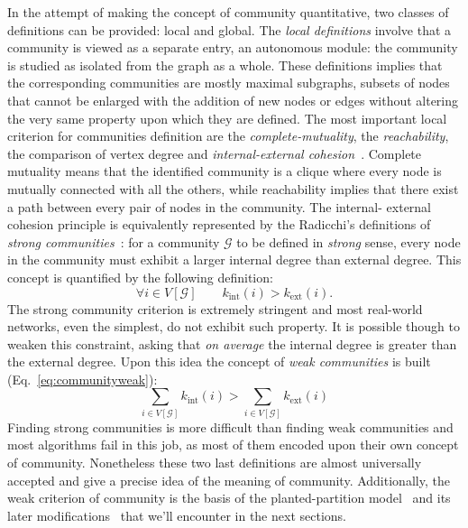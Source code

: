 \documentclass[11pt,              a4paper,              twoside,openright,              titlepage,              headinclude,footinclude,                            numbers=noenddot,              cleardoublepage=empty,]{scrreprt}
\begin{document}
In the attempt of making the concept of community quantitative, two classes of definitions can be provided: local and global.
The \emph{local definitions} involve that a community is viewed as a separate entry, an autonomous module: the community is studied as isolated from the graph as a whole.
These definitions implies that the corresponding communities are mostly maximal subgraphs, subsets of nodes that cannot be enlarged with the addition of new nodes or edges without altering the very same property upon which they are defined.
The most important local criterion for communities definition are the \emph{complete-mutuality}, the \emph{reachability}, the comparison of vertex degree and \emph{internal-external cohesion}~\cite{wasserman1994,alba1973}.
Complete mutuality means that the identified community is a clique where every node is mutually connected with all the others, while reachability implies that there exist a path between every pair of nodes in the community.
The internal- external cohesion principle is equivalently represented by the Radicchi's definitions of \emph{strong communities}~\cite{radicchi2004}: for a community $\mathcal{G}$ to be defined in \emph{strong} sense, every node in the community must exhibit a larger internal degree than external degree. This concept is quantified by the following definition:
\begin{equation}\label{eq:strongcommunities}
\forall i \in V[ \mathcal{G} ] \qquad k_{\textrm{int}}(i) > k_{\textrm{ext}}(i).
\end{equation}
The strong community criterion is extremely stringent and most real-world networks, even the simplest, do not exhibit such property.
It is possible though to weaken this constraint, asking that \emph{on average} the internal degree is greater than the external degree.
Upon this idea the concept of \emph{weak communities} is built (Eq.~\ref{eq:communityweak}):
\begin{equation}\label{eq:communityweak}
\sum \limits_{i \in V[\mathcal{G}]} k_{\textrm{int}}(i) > \sum \limits_{i \in V[\mathcal{G}]} k_{\textrm{ext}}(i)
\end{equation}
Finding strong communities is more difficult than finding weak communities and most algorithms fail in this job, as most of them encoded upon their own concept of community.
Nonetheless these two last definitions are almost universally accepted and give a precise idea of the meaning of community.
Additionally, the weak criterion of community is the basis of the planted-partition model~\cite{condon2000} and its later modifications~\cite{lancichinetti2008} that we'll encounter in the next sections.
\end{document}

